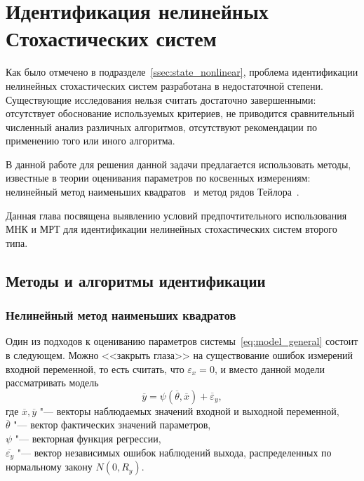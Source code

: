 \chapter[Идентификация нелинейных стохастических систем]{%
  Идентификация нелинейных \chapternewline
  Стохастических систем
}

Как было отмечено в подразделе~\ref{ssec:state_nonlinear},
проблема идентификации нелинейных стохастических систем разработана
в недостаточной степени.
Существующие исследования нельзя считать достаточно завершенными:
отсутствует обоснование используемых критериев,
не приводится сравнительный численный анализ различных алгоритмов,
отсутствуют рекомендации по применению того или иного алгоритма.

В данной работе для решения данной задачи предлагается использовать методы,
известные в теории оценивания параметров по косвенных измерениям:
нелинейный метод наименьших квадратов~\cite{mukha_2009} и
метод рядов Тейлора~\cite{mukha_2000}.

Данная глава посвящена выявлению условий предпочтительного
использования МНК и МРТ для идентификации нелинейных
стохастических систем второго типа.

\section{Методы и алгоритмы идентификации}

\subsection{Нелинейный метод наименьших квадратов}\label{ssec:nonlinear_method_lse}

Один из подходов к оцениванию параметров системы~\eqref{eq:model_general}
состоит в следующем.
Можно <<закрыть глаза>> на существование ошибок измерений
входной переменной, то есть считать, что \( \varepsilon_x = 0 \),
и вместо данной модели рассматривать модель
\begin{equation*}
  \overline{y} = \psi(\overline{\theta}, \overline{x}) + \overline{\varepsilon}_y,
\end{equation*}
где \( \overline{x}, \overline{y} \)
"--- векторы наблюдаемых значений входной и выходной переменной, \\
\hspace*{7mm} \( \overline{\theta} \)
"--- вектор фактических значений параметров, \\
\hspace*{7mm} \( \psi \)
"--- векторная функция регрессии, \\
\hspace*{7mm} \( \overline{\varepsilon_y} \)
"--- вектор независимых ошибок наблюдений выхода,
распределенных по нормальному закону \( N(0, R_y) \).

